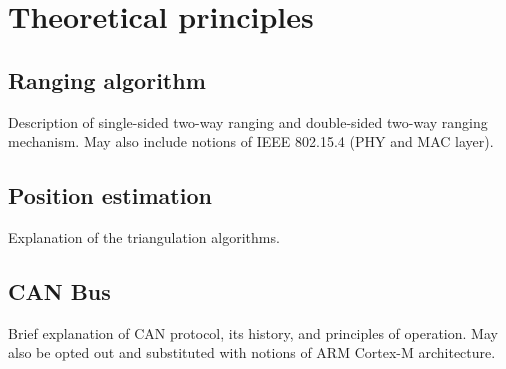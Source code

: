 \section{Theoretical principles}



\subsection{Ranging algorithm}
Description of single-sided two-way ranging and double-sided two-way ranging mechanism.
May also include notions of IEEE 802.15.4 (PHY and MAC layer).

\subsection{Position estimation}
Explanation of the triangulation algorithms.

\subsection{CAN Bus}
Brief explanation of CAN protocol, its history, and principles of operation.
May also be opted out and substituted with notions of ARM Cortex-M architecture.
